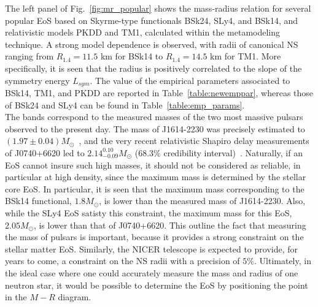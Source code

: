 The left panel of Fig.~\ref{fig:mr_popular} shows the mass-radius relation for 
several popular EoS based on Skyrme-type functionals BSk24, SLy4, and BSk14, 
and relativistic models PKDD and TM1, calculated within the metamodeling 
technique. A strong model dependence is observed, with radii of canonical NS 
ranging from $R_{1.4}=11.5$ km for BSk14 to $R_{1.4}=14.5$ km for TM1. More
specifically, it is seen that the radius is positively correlated to the slope 
of the symmetry energy $L_{sym}$. The value of the empirical parameters 
associated to BSk14, TM1, and PKDD are reported in Table~\ref{table:newemppar}, 
whereas those of BSk24 and SLy4 can be found in Table~\ref{table:emp_params}.\\
The bands correspond to the measured masses of the two most massive
pulsars observed to the present day. The mass of J1614-2230 was precisely 
estimated to $(1.97\pm 0.04)M_\odot$~\cite{Demorest2010}, and the very recent
relativistic Shapiro delay measurements of J0740+6620 led to 
$2.14_{-0.09}^{0.10}M_\odot$ ($68.3\%$ credibility
interval)~\cite{Cromartie2020}. Naturally, if an
EoS cannot insure such high masses, it should not be considered as reliable, 
in particular at high density, since the maximum mass is determined by the 
stellar core EoS. In particular, it is seen that the maximum mass corresponding
to the BSk14 functional, $1.8M_\odot$, is lower than the measured mass
of J1614-2230. Also, while the SLy4 EoS satisty this constraint, the maximum 
mass for this EoS, $2.05M_\odot$, is lower than that of J0740+6620. This 
outline the fact that measuring the mass of pulsars is important, because it 
provides a strong constraint on the stellar matter EoS. Similarly, the NICER
telescope is expected to provide, for years to come, a constraint on the NS
radii with a precision of $5\%$. Ultimately, in the ideal case where one could 
accurately measure the mass and radius of one neutron star, it would be possible 
to determine the EoS by positioning the point in the $M-R$ diagram.

